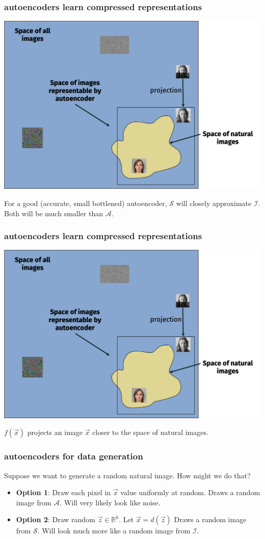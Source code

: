 \documentclass[handout,compress]{beamer}
\newcommand{\R}{\mathbb{R}}
\begin{document}
\begin{frame}
	\frametitle{autoencoders learn compressed representations}
	\begin{center}
		\includegraphics[width=.8\textwidth]{autoencoder_cartoon.png}
	\end{center}
	For a good (accurate, small bottlened) autoencoder, $\mathcal{S}$ will closely approximate $\mathcal{I}$. Both will be much smaller than $\mathcal{A}$. 
\end{frame}

\begin{frame}
	\frametitle{autoencoders learn compressed representations}
	\begin{center}
		\includegraphics[width=.8\textwidth]{autoencoder_cartoon.png}
	\end{center}
	$f(\vec{x})$ projects an image $\vec{x}$ closer to the space of natural images.
\end{frame}

\begin{frame}
	\frametitle{autoencoders for data generation}
	Suppose we want to generate a random natural image. How might we do that?
	
	\begin{itemize}
		\item \textbf{Option 1}: Draw each pixel in $\vec{x}$ value uniformly at random. Draws a random image from $\mathcal{A}$. Will very likely look like noise.
		\item \textbf{Option 2}: Draw random $\vec{z}\in \R^k$. Let $\vec{x} = d(\vec{z})$ Draws a random image from $\mathcal{S}$. Will look much more like a random image from $\mathcal{I}$.
	\end{itemize}
\end{frame}
\end{document}
